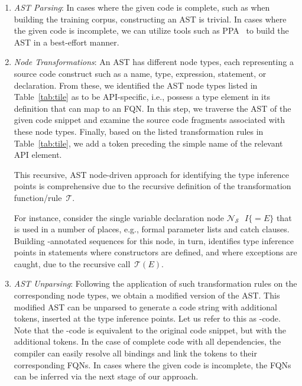 \begin{enumerate}
    \item \textit{AST Parsing}: In cases where the given code is complete, such as when building the training corpus, constructing an AST is trivial. In cases where the given code is incomplete, we can utilize tools such as PPA~\cite{dagenais-oopsla08} to build the AST in a best-effort manner. 

    \item \textit{Node Transformations}: An AST has different node
    types, each representing a source code construct such as a name,
    type, expression, statement, or declaration. From these, we
    identified the AST node types listed in Table~\ref{tab:tile} as to
    be API-specific, i.e., possess a type element in its definition
    that can map to an FQN. In this step, we traverse the AST of the
    given code snippet and examine the source code fragments
    associated with these node types. Finally, based on the listed
    transformation rules in Table~\ref{tab:tile}, we add a \blank
    token preceding the simple name of the relevant API element.


    \vspace{2pt}
    \par This recursive, AST node-driven approach for identifying the type inference points is comprehensive due to the recursive definition of the transformation function/rule~$\mathcal{T}$.

For instance, consider the single variable declaration node $\mathcal{N}_\mathcal{S}\text{ }I \{=E\}$ that is used in a number of places, e.g., formal parameter lists and catch clauses. Building \blank-annotated sequences for this node, in turn, identifies type inference points in statements where constructors are defined, and where exceptions are caught, due to the recursive call~$\mathcal{T}(E)$.

    \item \textit{AST Unparsing}: 
    Following the application of 
    such
    transformation rules on the corresponding node types,
    we obtain a modified version of the AST. This modified AST can be unparsed to generate a code string with additional \blank tokens, inserted at the type inference points. Let us refer to this as \blank-code.
    Note that the \blank-code is equivalent to the original code snippet, but with the additional \blank tokens.
    In the case of complete code with all dependencies, the compiler can easily resolve all bindings and link the \blank tokens to their corresponding FQNs. In cases where the given code is incomplete, the FQNs can be inferred via the next stage of our approach.
\end{enumerate}  


